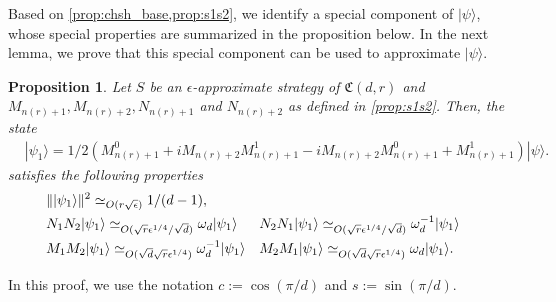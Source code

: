 \documentclass[11pt,letterpaper]{article}
\newcommand{\ket}[1]{|#1\rangle}
\newcommand{\braket}[2]{\langle#1|#2\rangle}
\DeclarePairedDelimiter{\norm}{\lVert}{\rVert}
\newcommand{\1}{\mathbb{1}}
\newcommand{\nr}{n(r)}
\newcommand{\fC}{\mathfrak{C}}
\newcommand{\ep}{\epsilon}
\newcommand{\se}{\sqrt{\epsilon}}
\newcommand{\qe}{\epsilon^{1/4}}
\newcommand{\sd}{\sqrt{d}}
\newcommand{\sr}{\sqrt{r}}
\newcommand{\appd}[1]{\simeq_{#1}}
\newtheorem{proposition}[theorem]{Proposition}
\theoremstyle{definition}
\begin{document}
Based on \cref{prop:chsh_base,prop:s1s2}, we identify a special component of $\ket{\psi}$, whose special properties are summarized
in the proposition below. In the next lemma, we prove that this special component can be used to approximate $\ket{\psi}$. 
\begin{proposition}
    \label{prop:psi1}
	Let $S$ be an $\ep$-approximate strategy of $\fC(d,r)$ and $M_{\nr+1}, M_{\nr+2},N_{\nr+1}$ and $N_{\nr+2}$ as defined in \cref{prop:s1s2}.
	Then, the state
	\begin{align}
		&\ket{\psi_1} =1/2(M_{\nr+1}^0 + iM_{\nr+2}M_{\nr+1}^1 - iM_{\nr+2}M_{\nr+1}^0 +M_{\nr+1}^1) \ket{\psi}.
	\end{align}
	satisfies the following properties
	\begin{align}
	 \label{eq:psi1_norm} &\norm{\ket{\psi_1}}^2 \appd{O(r\se)} 1/(d-1),\\
	 \label{eq:psi1_eig1} &N_1N_2 \ket{\psi_1} \appd{O(\sr \qe/\sd)} \omega_d\ket{\psi_1} 
	 && N_2N_1 \ket{\psi_1} \appd{O(\sr \qe/\sd)} \omega_d^{-1} \ket{\psi_1} \\
	 \label{eq:psi1_eig2} &M_1M_2 \ket{\psi_1} \appd{O(\sd\sr \qe)} \omega_d^{-1} \ket{\psi_1}
	 && M_2M_1 \ket{\psi_1} \appd{O(\sd\sr \qe)} \omega_d \ket{\psi_1}.
	\end{align}
\end{proposition}
In this proof, we use the notation $c := \cos(\pi/d)$ and $s := \sin(\pi/d)$.
\end{document}
